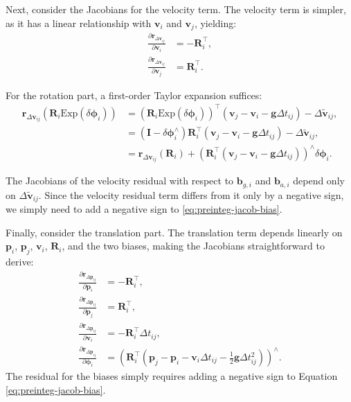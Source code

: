 Next, consider the Jacobians for the velocity term. The velocity term is simpler, as it has a linear relationship with $\bm{v}_i$ and $\bm{v}_j$, yielding:
\begin{subequations}\label{key}
	\begin{align}
		\frac{ \partial \bm{r}_{\Delta \bm{v}_{ij}}}{\partial \bm{v}_i} &= -\bm{R}_i^\top, \\
		\frac{ \partial \bm{r}_{\Delta \bm{v}_{ij}}}{\partial \bm{v}_j} &= \bm{R}_i^\top.
	\end{align}
\end{subequations}

For the rotation part, a first-order Taylor expansion suffices:
\begin{equation}
	\begin{aligned}
		\bm{r}_{\Delta \bm{v}_{ij}} \left( \bm{R}_i \mathrm{Exp} (\delta \boldsymbol{\phi}_i)\right) &= 
		(\bm{R}_i \mathrm{Exp} (\delta \boldsymbol{\phi}_i)) ^\top (\bm{v}_j - \bm{v}_i - \bm{g} \Delta 
		t_{ij}) - \Delta \tilde{\bm{v}}_{ij}, \\
		&= (\bm{I} - \delta \boldsymbol{\phi}^\wedge_i) \bm{R}_i^\top  (\bm{v}_j - \bm{v}_i - \bm{g} 
		\Delta t_{ij}) - \Delta \tilde{\bm{v}}_{ij}, \\
		&= \bm{r}_{\Delta \bm{v}_{ij}} (\bm{R}_i) + \left(\bm{R}_i^\top  (\bm{v}_j - \bm{v}_i - \bm{g} 
		\Delta t_{ij}) \right)^\mathrm{\wedge} \delta \boldsymbol{\phi}_i.
	\end{aligned}
\end{equation}

The Jacobians of the velocity residual with respect to $\bm{b}_{g,i}$ and $\bm{b}_{a,i}$ depend only on $\Delta \tilde{\bm{v}}_{ij}$. Since the velocity residual term differs from it only by a negative sign, we simply need to add a negative sign to \eqref{eq:preinteg-jacob-bias}.

Finally, consider the translation part. The translation term depends linearly on $\bm{p}_i$, $\bm{p}_j$, $\bm{v}_i$, $\bm{R}_i$, and the two biases, making the Jacobians straightforward to derive:
\begin{subequations}\label{key}
	\begin{align}
		\frac{\partial \bm{r}_{\Delta \bm{p}_{ij}}}{\partial \bm{p}_i } &= -\bm{R}_i^\top, \\
		\frac{\partial \bm{r}_{\Delta \bm{p}_{ij}}}{\partial \bm{p}_j } &= \bm{R}_i^\top, \\
		\frac{\partial \bm{r}_{\Delta \bm{p}_{ij}}}{\partial \bm{v}_i } &= -\bm{R}_i^\top \Delta t_{ij}, \\
		\frac{\partial \bm{r}_{\Delta \bm{p}_{ij}}}{\partial \boldsymbol{\phi}_i } &= \left( 
		\bm{R}_i^\top \left(\bm{p}_j - \bm{p}_i - \bm{v}_i \Delta t_{ij} - \frac{1}{2}\bm{g} \Delta 
		t_{ij}^2 \right) \right)^\wedge.
	\end{align}
\end{subequations}
The residual for the biases simply requires adding a negative sign to Equation \eqref{eq:preinteg-jacob-bias}.

